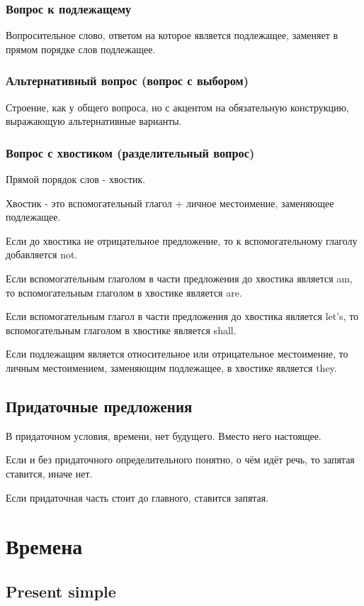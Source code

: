 \documentclass[oneside]{book}
\begin{document}
\subsection{Вопрос к подлежащему}
Вопросительное слово, ответом на которое является подлежащее,
заменяет в прямом порядке слов подлежащее.

\subsection{Альтернативный вопрос (вопрос с выбором)}
Строение, как у общего вопроса, но с акцентом на обязательную конструкцию,
выражающую альтернативные варианты.

\subsection{Вопрос с хвостиком (разделительный вопрос)}
Прямой порядок слов - хвостик.

Хвостик - это вспомогательный глагол + личное местоимение, заменяющее подлежащее.

Если до хвостика не отрицательное предложение, то
к вспомогательному глаголу добавляется not.

Если вспомогательным глаголом в части предложения до хвостика является am,
то вспомогательным глаголом в хвостике является are.

Если вспомогательным глагол в части предложения до хвостика является let's,
то вспомогательным глаголом в хвостике является shall.

Если подлежащим является относительное или отрицательное местоимение,
то личным местоимением, заменяющим подлежащее, в хвостике является they.

\section{Придаточные предложения}
В придаточном условия, времени, нет будущего. Вместо него настоящее.

Если и без придаточного определительного понятно, о чём идёт речь,
то запятая ставится, иначе нет.

Если придаточная часть стоит до главного, ставится запятая.

\chapter{Времена}
\section{Present simple}
\end{document}

